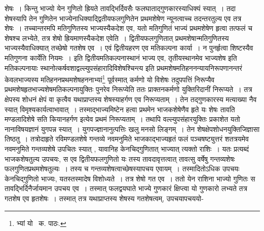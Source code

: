 \documentclass[11pt, openany]{book}
\begin{document}
\noindent शेषः~। किन्तु भाज्यो येन गुणितो ह्रियते तावद्भिर्दिवसैः फलघाताद्गुणकारस्याधिक्यं स्यात्~। तदा शेषस्यापि तेन गुणितेन भाज्येनाधिक्याद्द्वितीयफलगुणितेन प्रथमशेषेण न्यूनत्वाच्च तदन्तरतुल्य एव तत्र शेषः~। तच्चान्तरमपि मतिगुणितस्य भाज्यस्यैकदेश एव, यतो मतिगुणितं भाज्यं प्रथमशेषेण हृत्वा तत्फलं च शेषश्च लभ्येते, तत्र शेषो ह्रियमाणस्यैकदेश एवेति~। द्वितीयफलगुणितात् प्रथमशेषान्मतिगुणितस्य भाज्यस्यैवाधिक्यात् तच्छेषो गतशेष एव~। एवं द्वितीयहरण एव मतिकल्पना कार्या~। न पुनर्हृत्वा शिष्टस्यैव मतिगुणना कार्येति नियमः~। इति द्वितीयमतिकल्पनास्थानं भाज्य एव, तृतीयस्थानमेव भाज्यशेष इति मतिकल्पनायाः स्थानोत्कर्षवशाद्वल्ल्युपसंहारादिविशेषश्चिन्त्य इति प्रथमशेषमतिहननन्यायनिरूपणानन्तरं केवलभाज्यस्य मतिहननप्रथमशेषहननाभ्यां\renewcommand{\thefootnote}{१}\footnote{भ्यां यो \textendash\ क. पाठः.} पूर्वस्मात् कर्मणो यो विशेषः तदुपपत्तिं निरूप्यैव प्रथमशेषहृतभाज्यशेषमतिकल्पनायुक्तिः पुनरेव निरूप्येति ततः प्राक्तनकर्मणो युक्तिरिदानीं निरूप्यते~। तत्र क्षेपस्य शोधनं क्षेपं
वा कृत्वैव यथाप्राप्तस्य शेषस्याहर्गण एव निरूप्यताम्~। तेन तद्गुणकारस्य मत्याख्या नैव स्यात् विमृश्यकार्यत्वाभावात्~। तस्माद्भाज्यमिष्टेन
हत्वा प्रथमेन भाजकशेषेणैव हृते यः शेषः तावति मण्डलादिशेषे सति कियानहर्गण इत्येव प्रथमं निरूप्यताम्~। तथापि वल्ल्युपसंहारयुक्तिः प्रकाशेत
यतो नानाविषयज्ञानं युगपन्न स्यात्~। युगपज्ज्ञानानुत्पत्तिः खलु मनसो लिङ्गम्~। तेन शेषक्षेपशोधनयुक्तिजिज्ञासा तिष्ठतु~। तत्रोदाहृते रविमण्डलशेषे
गन्तव्ये नवमनुमिते भाजकाद्भाज्यहृतं फलं पञ्चषष्ट्युत्तरं शतत्रयमेव नवमनुमिते गन्तव्यशेषे उपचितः स्यात् , यावानिह केनचिद्गुणितात् भाज्यात् त्यक्तो राशिः~। यतः प्रत्यब्दं भाजकशेषतुल्य उपचयः, स एव द्वितीयफलगुणितो यः तस्य तावदावृत्तत्वात् तावत्सु वर्षेषु गन्तव्यशेषः फलगुणितप्रथमशेषतुल्यः~। तस्य च गन्तव्यशेषत्वाच्छेषस्यापचय एवायम्~। तस्मादितोऽधिक उपचयः केनचिद्गुणितो भाज्यः, यतस्तस्मादेष विशोध्यते~। तत्र शेषो गत एव~। ततो येन राशिना भाज्यो गुणितः स तावद्भिर्दिनैर्जायमान उपचय एव~। तस्मात् फलद्वयघाते भाज्ये गुणकारं क्षिप्त्वा यो गुणकारो लभ्यते तत्र गतशेष एव हृतशेषः~। तस्मात् तत्र यथाप्राप्तस्य शेषस्य गतशेषत्वम्, उपचयापचययो-

\newpage
\end{document}
